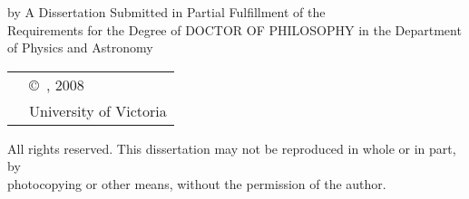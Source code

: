 
\pagebreak
{
	\centering
	\thesistitle
	\tpbreak
	by
	\tpbreak
	\nameanddegrees
	\tpbreak
	A Dissertation Submitted in Partial Fulfillment of the \\
	Requirements for the Degree of
	\tpbreak
	DOCTOR OF PHILOSOPHY
	\tpbreak
	in the Department of Physics and Astronomy\\
	\vfill
	\begin{tabular}{cl}
		& \copyright\ \yourname, 2008\\
		& \phantom{\copyright} University of Victoria
	\end{tabular}
	\tpbreak
	All rights reserved. This dissertation may not be reproduced in whole or in part, by \\
	\hfill photocopying or other means, without the permission of the author. 
	\hfill
}
\pagebreak
